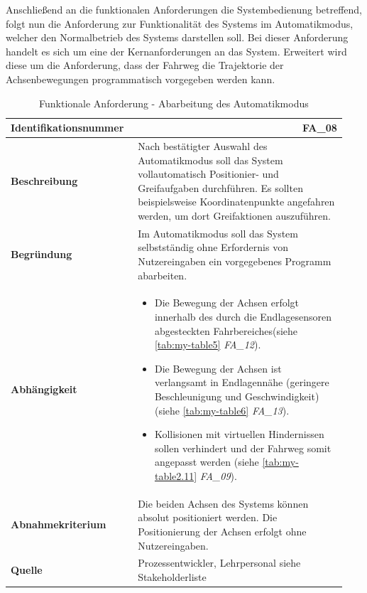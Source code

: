 \documentclass[../../../Bachelorarbeit.tex]{subfiles}
\begin{document}
Anschließend an die funktionalen Anforderungen die Systembedienung betreffend, folgt nun die Anforderung zur Funktionalität des Systems im Automatikmodus, welcher den Normalbetrieb des Systems darstellen soll. Bei dieser Anforderung handelt es sich um eine der Kernanforderungen an das System. Erweitert wird diese um die Anforderung, dass der Fahrweg \bzw die Trajektorie der Achsenbewegungen programmatisch vorgegeben werden kann.

\begin{table}[H]
    \centering
    \begin{tabular}{ p{0.34\linewidth}  p{0.6\linewidth} } 
        \hline
        \textbf{Identifikationsnummer}  & \multicolumn{1}{r}{FA\_08} \\ \hline
        \textbf{Beschreibung}           & Nach bestätigter Auswahl des Automatikmodus soll das System vollautomatisch Positionier- und Greifaufgaben durchführen. Es sollten beispielsweise Koordinatenpunkte angefahren werden, um dort Greifaktionen auszuführen. \\
        \textbf{Begründung}             & Im Automatikmodus soll das System selbstständig ohne Erfordernis von Nutzereingaben ein vorgegebenes Programm abarbeiten. \\
        \textbf{Abhängigkeit}           &   {\begin{itemize}[noitemsep,topsep=0pt,parsep=0pt,partopsep=0pt,leftmargin=*]
                                                \item Die Bewegung der Achsen erfolgt innerhalb des durch die Endlagesensoren abgesteckten Fahrbereiches(siehe \autoref{tab:my-table5} \textit{FA\_12}).
                                                \item Die Bewegung der Achsen ist verlangsamt in Endlagennähe (geringere Beschleunigung und Geschwindigkeit) (siehe \autoref{tab:my-table6} \textit{FA\_13}).
                                                \item Kollisionen mit virtuellen Hindernissen sollen verhindert und der Fahrweg somit angepasst werden (siehe \autoref{tab:my-table2.11} \textit{FA\_09}).
                                            \end{itemize}} \\
        \textbf{Abnahmekriterium}       & Die beiden Achsen des Systems können absolut positioniert werden. Die Positionierung der Achsen erfolgt ohne Nutzereingaben. \\
        \textbf{Quelle}                 & Prozessentwickler, Lehrpersonal siehe Stakeholderliste \\ \hline
    \end{tabular}
    \caption[\acs{fa} - Abarbeitung Automatikmodus]{Funktionale Anforderung - Abarbeitung des Automatikmodus}
    \label{tab:my-table2.10}
\end{table}
\end{document}
